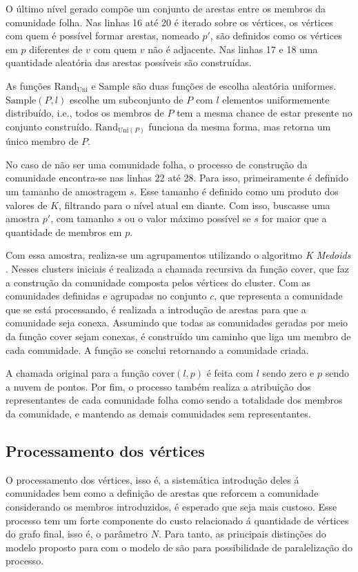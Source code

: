 \documentclass[notes.tex]{subfiles}
\begin{document}
O último nível gerado compõe um conjunto de arestas entre os membros da comunidade folha.
Nas linhas 16 até 20 é iterado sobre os vértices, os vértices com quem é possível formar arestas, nomeado $p'$, são definidos como os vértices em $p$ diferentes de $v$ com quem $v$ não é adjacente.
Nas linhas 17 e 18 uma quantidade aleatória das arestas possíveis são construídas.

As funções $\text{Rand}_{\text{Uni}}$ e $\text{Sample}$ são duas funções de escolha aleatória uniformes.
$\text{Sample}(P, l)$ escolhe um subconjunto de $P$ com $l$ elementos uniformemente distribuído, i.e., todos os membros de $P$ tem a mesma chance de estar presente no conjunto construído.
$\text{Rand}_{\text{Uni}(P)}$ funciona da mesma forma, mas retorna um único membro de $P$.

No caso de não ser uma comunidade folha, o processo de construção da comunidade encontra-se nas linhas 22 até 28.
Para isso, primeiramente é definido um tamanho de amostragem $s$.
Esse tamanho é definido como um produto dos valores de $K$, filtrando para o nível atual em diante.
Com isso, buscasse uma amostra $p'$, com tamanho  $s$ ou o valor máximo possível se  $s$ for maior que a quantidade de membros em  $p$.

Com essa amostra, realiza-se um agrupamentos utilizando o algoritmo \emph{K Medoids} \cite{largeron2015generating}.
Nesses clusters iniciais é realizada a chamada recursiva da função $\text{cover}$, que faz a construção da comunidade composta pelos vértices do cluster.
Com as comunidades definidas e agrupadas no conjunto $c$, que representa a comunidade que se está processando, é realizada a introdução de arestas para que a comunidade seja conexa.
Assumindo que todas as comunidades geradas por meio da função  $\text{cover}$ sejam conexas, é construído um caminho que liga um membro de cada comunidade.
A função se conclui retornando a comunidade criada.

A chamada original para a função $\text{cover}(l, p)$ é feita com $l$ sendo zero e  $p$ sendo a nuvem de pontos.
Por fim, o processo também realiza a atribuição dos representantes de cada comunidade folha como sendo a totalidade dos membros da comunidade, e mantendo as demais comunidades sem representantes.

\subsection{Processamento dos vértices}

O processamento dos vértices, isso é, a sistemática introdução deles á comunidades bem como a definição de arestas que reforcem a comunidade considerando os membros introduzidos, é esperado que seja mais custoso.
Esse processo tem um forte componente do custo relacionado á quantidade de vértices do grafo final, isso é, o parâmetro $N$.
Para tanto, as principais distinções do modelo proposto para com o modelo de  são para possibilidade de paralelização do processo.
\end{document}

